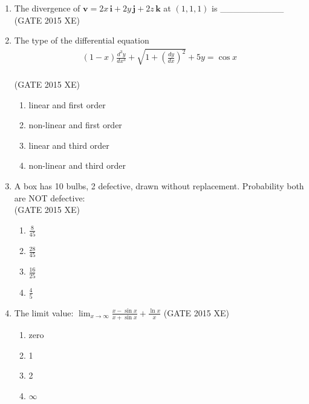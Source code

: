 \documentclass[journal,12pt,onecolumn]{IEEEtran}
\begin{document}
\begin{enumerate}
\item The divergence of $\mathbf{v} = 2x\,\mathbf{i} + 2y\,\mathbf{j} + 2z\,\mathbf{k}$ at $(1,1,1)$ is \_\_\_\_\_\_\_\_\_\_
\hfill{(GATE 2015 XE)} \\

\item The type of the differential equation  
\begin{align}
(1-x)\frac{d^3 y}{dx^3} + \sqrt{1+\left(\frac{dy}{dx}\right)^2} + 5y = \cos{x}
\end{align}\\

\hfill{(GATE 2015 XE)} 
\begin{multicols}{2}
\begin{enumerate}
\item linear and first order
\item non-linear and first order
\item linear and third order
\item non-linear and third order
\end{enumerate}
\end{multicols}


\item A box has 10 bulbs, 2 defective, drawn without replacement. Probability both are NOT defective:\\
\hfill{(GATE 2015 XE)} 

\begin{multicols}{4}
\begin{enumerate}
\item $\frac{8}{45}$
\item $\frac{28}{45}$
\item $\frac{16}{25}$
\item $\frac{4}{5}$
\end{enumerate}
\end{multicols}

\item The limit value:
$\lim_{x\to\infty} \frac{x - \sin{x}}{x + \sin{x}} + \frac{\ln{x}}{x}$
\hfill{(GATE 2015 XE)} 

\begin{multicols}{4}
\begin{enumerate}
\item zero
\item 1
\item 2
\item $\infty$
\end{enumerate}
\end{multicols}


\end{enumerate}
\end{document}
